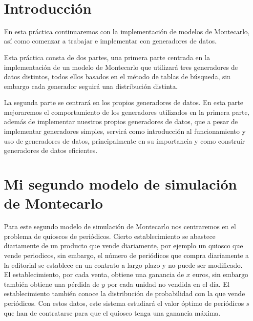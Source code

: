 \documentclass[12pt, spanish]{article}
\makeatletter
\let\thedate\@date
\makeatother
\begin{document}
\begin{titlepage}
    {\large \thedate}\\[0.5cm]
    {\doclicenseThis}

    \vfill

\end{titlepage}


\tableofcontents
\pagebreak



\section*{Introducción}

En esta práctica continuaremos con la implementación de modelos de Montecarlo, así como comenzar a trabajar e implementar con generadores de datos.

Esta práctica consta de dos partes, una primera parte centrada en la implementación de un modelo de Montecarlo que utilizará tres generadores de datos distintos, todos ellos basados en el método de tablas de búsqueda, sin embargo cada generador seguirá una distribución distinta.

La segunda parte se centrará en los propios generadores de datos. En esta parte mejoraremos el comportamiento de los generadores utilizados en la primera parte, además de implementar nuestros propios generadores de datos, que a pesar de implementar generadores simples, servirá como introducción al funcionamiento y uso de generadores de datos, principalmente en su importancia y como construir generadores de datos eficientes.


\section{Mi segundo modelo de simulación de Montecarlo}

Para este segundo modelo de simulación de Montecarlo nos centraremos en el problema de quioscos de periódicos. Cierto establecimiento se abastece diariamente de un producto que vende diariamente, por ejemplo un quiosco que vende periodicos, sin embargo, el número de periódicos que compra diariamente a la editorial se establece en un contrato a largo plazo y no puede ser modificado. El establecimiento, por cada venta, obtiene una ganancia de $x$ euros, sin embargo también obtiene una pérdida de $y$ por cada unidad no vendida en el día. El establecimiento también conoce la distribución de probabilidad con la que vende periódicos. Con estos datos, este sistema estudiará el valor óptimo de periódicos $s$ que han de contratarse para que el quiosco tenga una ganancia máxima.
\end{document}
